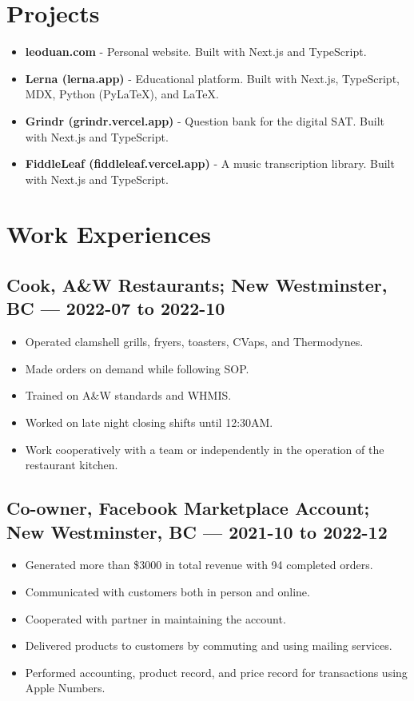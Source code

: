 \documentclass{article}
\begin{document}
\section*{Projects}

\begin{itemize}
    \item \textbf{leoduan.com} - Personal website. Built with Next.js and TypeScript.
    \item \textbf{Lerna (lerna.app)} - Educational platform. Built with Next.js, TypeScript, MDX, Python (PyLaTeX), and LaTeX.
    \item \textbf{Grindr (grindr.vercel.app)} - Question bank for the digital SAT. Built with Next.js and TypeScript.
    \item \textbf{FiddleLeaf (fiddleleaf.vercel.app)} - A music transcription library. Built with Next.js and TypeScript.
\end{itemize}

\section*{Work Experiences}

\subsection*{Cook, A\&W Restaurants; New Westminster, BC — 2022-07 to 2022-10}

\begin{itemize}
    \item Operated clamshell grills, fryers, toasters, CVaps, and Thermodynes.
    \item Made orders on demand while following SOP.
    \item Trained on A\&W standards and WHMIS.
    \item Worked on late night closing shifts until 12:30AM.
    \item Work cooperatively with a team or independently in the operation of the restaurant kitchen.
\end{itemize}

\subsection*{Co-owner, Facebook Marketplace Account; New Westminster, BC — 2021-10 to 2022-12}

\begin{itemize}
    \item Generated more than \$3000 in total revenue with 94 completed orders.
    \item Communicated with customers both in person and online.
    \item Cooperated with partner in maintaining the account.
    \item Delivered products to customers by commuting and using mailing services.
    \item Performed accounting, product record, and price record for transactions using Apple Numbers.
\end{itemize}
\end{document}
